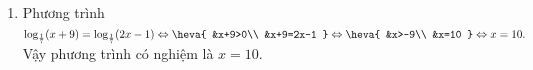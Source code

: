 \begin{bt}
{\begin{enumerate}
			\[
			\Leftrightarrow 
			\heva{
				&x>\dfrac{5}{3}\\
				&3x-5=2x+1
			} \Leftrightarrow
			\heva{
				&x>\dfrac{5}{3}\\
				&x=6
			} \Leftrightarrow x=6.\]
			Vậy phương trình có nghiệm là $x=6$.
			\item  Phương trình $\log_{\frac{1}{7}}(x+9)=\log_{\frac{1}{7}} (2x-1)
			\Leftrightarrow 
			\heva{
				&x+9>0\\
				&x+9=2x-1
			} \Leftrightarrow
			\heva{
				&x>-9\\
				&x=10
			} \Leftrightarrow x=10.
			$\\
			Vậy phương trình có nghiệm là $x=10$.
		\end{enumerate}
	}
\end{bt}

\begin{bt}%


\end{bt}
